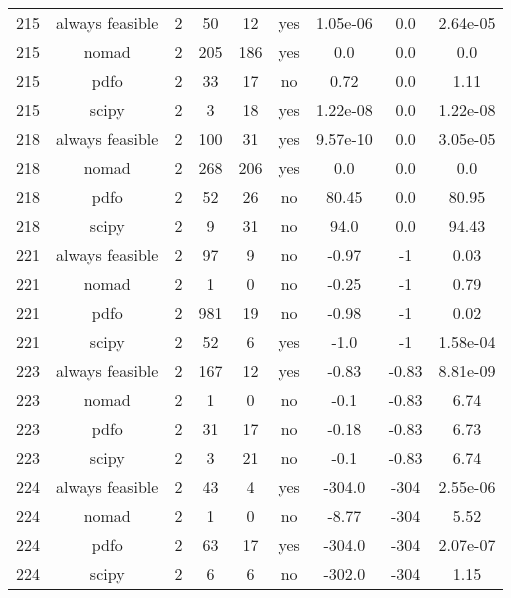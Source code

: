 \begin{scriptsize}
\begin{center}
\begin{longtable}{ccccccccc}
215 & always feasible &  2 &     50 &     12 &     yes &    1.05e-06 &         0.0 & 2.64e-05\\
215 &           nomad &  2 &    205 &    186 &     yes &         0.0 &         0.0 &      0.0\\
215 &            pdfo &  2 &     33 &     17 &      no &        0.72 &         0.0 &     1.11\\
215 &           scipy &  2 &      3 &     18 &     yes &    1.22e-08 &         0.0 & 1.22e-08\\
218 & always feasible &  2 &    100 &     31 &     yes &    9.57e-10 &         0.0 & 3.05e-05\\
218 &           nomad &  2 &    268 &    206 &     yes &         0.0 &         0.0 &      0.0\\
218 &            pdfo &  2 &     52 &     26 &      no &       80.45 &         0.0 &    80.95\\
218 &           scipy &  2 &      9 &     31 &      no &        94.0 &         0.0 &    94.43\\
221 & always feasible &  2 &     97 &      9 &      no &       -0.97 &          -1 &     0.03\\
221 &           nomad &  2 &      1 &      0 &      no &       -0.25 &          -1 &     0.79\\
221 &            pdfo &  2 &    981 &     19 &      no &       -0.98 &          -1 &     0.02\\
221 &           scipy &  2 &     52 &      6 &     yes &        -1.0 &          -1 & 1.58e-04\\
223 & always feasible &  2 &    167 &     12 &     yes &       -0.83 &       -0.83 & 8.81e-09\\
223 &           nomad &  2 &      1 &      0 &      no &        -0.1 &       -0.83 &     6.74\\
223 &            pdfo &  2 &     31 &     17 &      no &       -0.18 &       -0.83 &     6.73\\
223 &           scipy &  2 &      3 &     21 &      no &        -0.1 &       -0.83 &     6.74\\
224 & always feasible &  2 &     43 &      4 &     yes &      -304.0 &        -304 & 2.55e-06\\
224 &           nomad &  2 &      1 &      0 &      no &       -8.77 &        -304 &     5.52\\
224 &            pdfo &  2 &     63 &     17 &     yes &      -304.0 &        -304 & 2.07e-07\\
224 &           scipy &  2 &      6 &      6 &      no &      -302.0 &        -304 &     1.15\\

\end{longtable}
\end{center}
\end{scriptsize}
